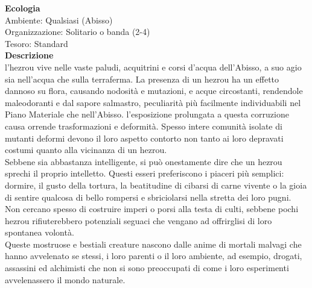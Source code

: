 \begin{multicols}{2}
\textbf{Ecologia}\\
Ambiente: Qualsiasi (Abisso)\\
Organizzazione: Solitario o banda (2-4)\\
Tesoro: Standard\\
\textbf{Descrizione}\\
l'hezrou vive nelle vaste paludi, acquitrini e corsi d’acqua dell'Abisso, a suo agio sia nell'acqua che sulla terraferma. La presenza di un hezrou ha un effetto dannoso su flora, causando nodosità e mutazioni, e acque circostanti, rendendole maleodoranti e dal sapore salmastro, peculiarità più facilmente individuabili nel Piano Materiale che nell'Abisso. l'esposizione prolungata a questa corruzione causa orrende trasformazioni e deformità. Spesso intere comunità isolate di mutanti deformi devono il loro aspetto contorto non tanto ai loro depravati costumi quanto alla vicinanza di un hezrou.\\
Sebbene sia abbastanza intelligente, si può onestamente dire che un hezrou sprechi il proprio intelletto. Questi esseri preferiscono i piaceri più semplici: dormire, il gusto della tortura, la beatitudine di cibarsi di carne vivente o la gioia di sentire qualcosa di bello rompersi e sbriciolarsi nella stretta dei loro pugni. Non cercano spesso di costruire imperi o porsi alla testa di culti, sebbene pochi hezrou rifiuterebbero potenziali seguaci che vengano ad offrirglisi di loro spontanea volontà.\\
Queste mostruose e bestiali creature nascono dalle anime di mortali malvagi che hanno avvelenato se stessi, i loro parenti o il loro ambiente, ad esempio, drogati, assassini ed alchimisti che non si sono preoccupati di come i loro esperimenti avvelenassero il mondo naturale.\\


\end{multicols}
